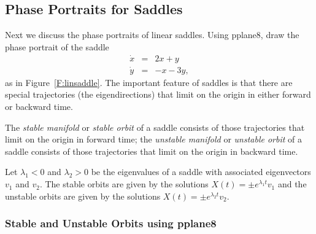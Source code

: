 \documentclass{ximera}
\begin{document}
\subsection*{Phase Portraits for Saddles}

Next we discuss the phase portraits of linear saddles.  Using
{\sf pplane8}, draw the phase portrait
of the saddle
\begin{equation}  \label{e:saddlet}
\begin{array}{rcl}
\dot{x} & = & 2x+y\\
\dot{y} & = & -x-3y,
\end{array}
\end{equation}
as in Figure~\ref{F:linsaddle}.  The important feature of saddles
is that there are special trajectories (the eigendirections) that
limit on the origin in either forward or backward time.

\begin{figure*}[htb]
           \centerline{%
           }
           \caption{(Left) Saddle phase portrait.
	(Right) First quadrant solution time series.}
           \label{F:linsaddle}
\end{figure*}

\begin{definition} \label{D:stablemfld}
The {\em stable manifold\/} or {\em stable orbit\/} of a saddle consists of
those trajectories that limit on the origin in forward time; the
{\em unstable manifold\/} or {\em unstable orbit\/} of a saddle consists of
those trajectories that limit on the origin in backward time.
\end{definition}
 
 

Let $\lambda_1<0$ and $\lambda_2>0$ be the eigenvalues of a saddle with
associated eigenvectors $v_1$ and $v_2$.  The stable orbits are given by the
solutions $X(t) = \pm e^{\lambda_1 t}v_1$ and the unstable orbits are given
by the solutions $X(t) = \pm e^{\lambda_2 t}v_2$.

\subsubsection*{Stable and Unstable Orbits using {\sf pplane8}}
\end{document}
